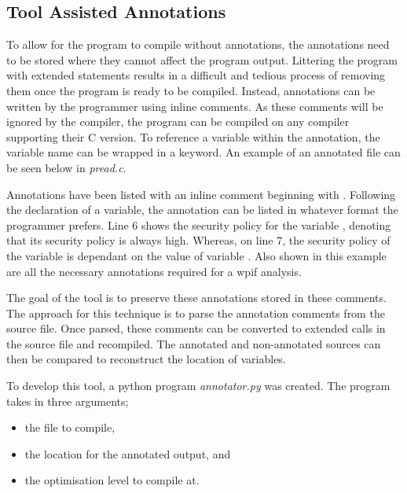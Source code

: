 \subsection{Tool Assisted Annotations}
\label{subsec:inlineTool}

To allow for the program to compile without annotations, the annotations need to be stored where they cannot affect the program output. Littering the program with extended  statements results in a difficult and tedious process of removing them once the program is ready to be compiled. Instead, annotations can be written by the programmer using inline comments. As these comments will be ignored by the compiler, the program can be compiled on any compiler supporting their C version. To reference a variable within the annotation, the variable name can be wrapped in a  keyword. An example of an annotated file can be seen below in \textit{pread.c}.



Annotations have been listed with an inline comment beginning with . Following the declaration of a variable, the annotation can be listed in whatever format the programmer prefers. Line 6 shows the security policy for the variable , denoting that its security policy is always high. Whereas, on line 7, the security policy of the variable  is dependant on the value of variable . Also shown in this example are all the necessary annotations required for a wpif analysis.

The goal of the tool is to preserve these annotations stored in these comments. The approach for this technique is to parse the annotation comments from the source file. Once parsed, these comments can be converted to extended  calls in the source file and recompiled. The annotated and non-annotated sources can then be compared to reconstruct the location of variables.

To develop this tool, a python program \textit{annotator.py} was created. The program takes in three arguments;

\begin{itemize}
    \item the file to compile,
    \item the location for the annotated output, and
    \item the optimisation level to compile at. 
\end{itemize}

